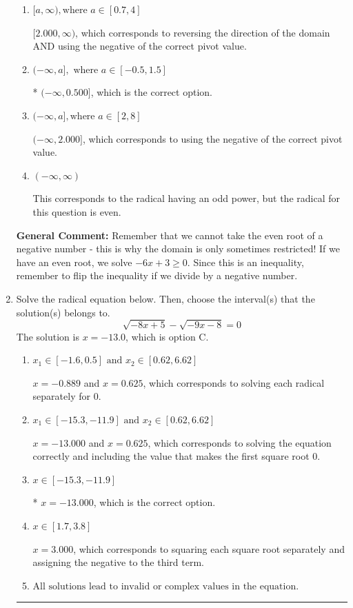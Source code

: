 \documentclass{extbook}[14pt]
\newcommand{\litem}[1]{\item #1

\rule{\textwidth}{0.4pt}}
\begin{document}
\begin{enumerate}
{\begin{enumerate}[label=\Alph*.]
 $[0.500, \infty)$, which corresponds to reversing the direction of the domain.
\item \( [a, \infty), \text{where } a \in [0.7, 4] \)

$[2.000, \infty)$, which corresponds to reversing the direction of the domain AND using the negative of the correct pivot value.
\item \( (-\infty, a], \text{ where } a \in [-0.5, 1.5] \)

* $(-\infty, 0.500]$, which is the correct option.
\item \( (-\infty, a], \text{where } a \in [2, 8] \)

$(-\infty, 2.000]$, which corresponds to using the negative of the correct pivot value.
\item \( (-\infty, \infty) \)

This corresponds to the radical having an odd power, but the radical for this question is even.
\end{enumerate}

\textbf{General Comment:} Remember that we cannot take the even root of a negative number - this is why the domain is only sometimes restricted! If we have an even root, we solve $-6 x + 3 \geq 0$. Since this is an inequality, remember to flip the inequality if we divide by a negative number.
}
\litem{
Solve the radical equation below. Then, choose the interval(s) that the solution(s) belongs to.
\[ \sqrt{-8 x + 5} - \sqrt{-9 x - 8} = 0 \]The solution is \( x = -13.0 \), which is option C.\begin{enumerate}[label=\Alph*.]
\item \( x_1 \in [-1.6, 0.5] \text{ and } x_2 \in [0.62,6.62] \)

$x = -0.889$ and $x = 0.625$, which corresponds to solving each radical separately for 0.
\item \( x_1 \in [-15.3, -11.9] \text{ and } x_2 \in [0.62,6.62] \)

$x = -13.000$ and $x = 0.625$, which corresponds to solving the equation correctly and including the value that makes the first square root 0.
\item \( x \in [-15.3,-11.9] \)

* $x = -13.000$, which is the correct option.
\item \( x \in [1.7,3.8] \)

$x = 3.000$, which corresponds to squaring each square root separately and assigning the negative to the third term.
\item \( \text{All solutions lead to invalid or complex values in the equation.} \)


\end{enumerate}}
\end{enumerate}
\end{document}
